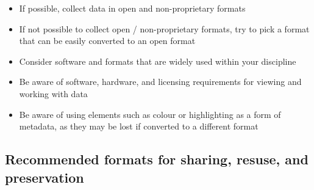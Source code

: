 \documentclass[
]{book}
\providecommand{\tightlist}{%
  \setlength{\itemsep}{0pt}\setlength{\parskip}{0pt}}
\begin{document}
\begin{itemize}
\tightlist
\item
  If possible, collect data in open and non-proprietary formats
\item
  If not possible to collect open / non-proprietary formats, try to pick a format that can be easily converted to an open format
\item
  Consider software and formats that are widely used within your discipline
\item
  Be aware of software, hardware, and licensing requirements for viewing and working with data
\item
  Be aware of using elements such as colour or highlighting as a form of metadata, as they may be lost if converted to a different format
\end{itemize}

\hypertarget{recommended-formats-for-sharing-resuse-and-preservation}{%
\subsection{Recommended formats for sharing, resuse, and preservation}\label{recommended-formats-for-sharing-resuse-and-preservation}}
\end{document}
